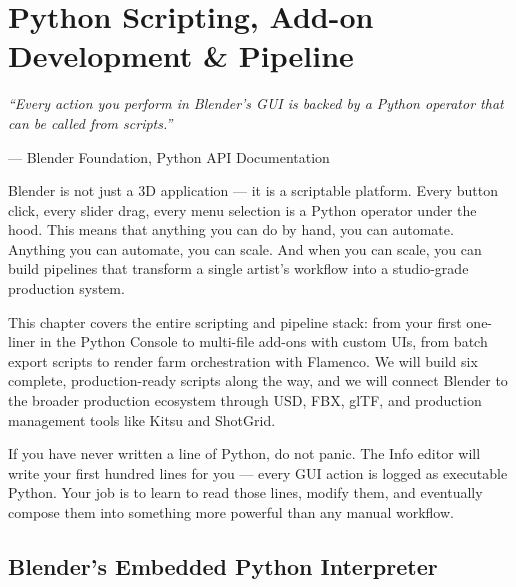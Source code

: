 
\chapter{Python Scripting, Add-on Development \& Pipeline}
\label{ch:scripting}

\begin{quotebox}
\itshape ``Every action you perform in Blender's GUI is backed by a Python operator that can be called from scripts.''

\upshape --- Blender Foundation, Python API Documentation
\end{quotebox}

\vspace{1em}
Blender is not just a 3D application --- it is a scriptable platform. Every button click, every slider drag, every menu selection is a Python operator under the hood. This means that anything you can do by hand, you can automate. Anything you can automate, you can scale. And when you can scale, you can build pipelines that transform a single artist's workflow into a studio-grade production system.

This chapter covers the entire scripting and pipeline stack: from your first one-liner in the Python Console to multi-file add-ons with custom UIs, from batch export scripts to render farm orchestration with Flamenco. We will build six complete, production-ready scripts along the way, and we will connect Blender to the broader production ecosystem through USD, FBX, glTF, and production management tools like Kitsu and ShotGrid.

If you have never written a line of Python, do not panic. The Info editor will write your first hundred lines for you --- every GUI action is logged as executable Python. Your job is to learn to read those lines, modify them, and eventually compose them into something more powerful than any manual workflow.

\section{Blender's Embedded Python Interpreter}
\label{sec:scripting-interpreter}

